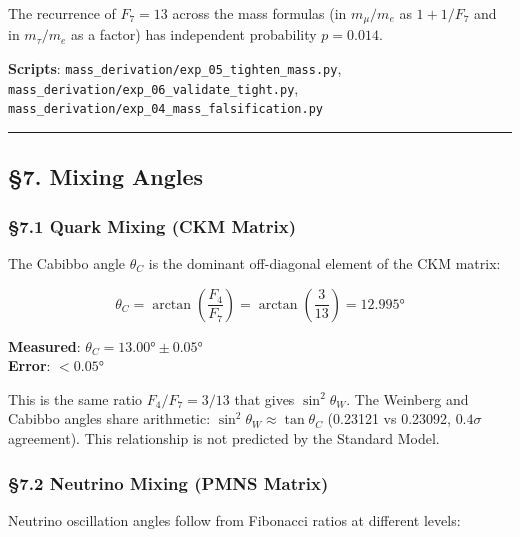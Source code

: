 \documentclass[
  11pt,
  a4paper]{article}
\begin{document}
The recurrence of \(F_7 = 13\) across the mass formulas (in
\(m_\mu/m_e\) as \(1 + 1/F_7\) and in \(m_\tau/m_e\) as a factor) has
independent probability \(p = 0.014\).

\textbf{Scripts}: \texttt{mass\_derivation/exp\_05\_tighten\_mass.py},
\texttt{mass\_derivation/exp\_06\_validate\_tight.py},
\texttt{mass\_derivation/exp\_04\_mass\_falsification.py}

\begin{center}\rule{0.5\linewidth}{0.5pt}\end{center}

\subsection{§7. Mixing Angles}\label{mixing-angles}

\subsubsection{§7.1 Quark Mixing (CKM
Matrix)}\label{quark-mixing-ckm-matrix}

The Cabibbo angle \(\theta_C\) is the dominant off-diagonal element of
the CKM matrix:

\[\theta_C = \arctan\left(\frac{F_4}{F_7}\right) = \arctan\left(\frac{3}{13}\right) = 12.995°\]

\textbf{Measured}: \(\theta_C = 13.00° \pm 0.05°\)\\
\textbf{Error}: \(< 0.05°\)

This is the same ratio \(F_4/F_7 = 3/13\) that gives \(\sin^2\theta_W\).
The Weinberg and Cabibbo angles share arithmetic:
\(\sin^2\theta_W \approx \tan\theta_C\) (0.23121 vs 0.23092,
\(0.4\sigma\) agreement). This relationship is not predicted by the
Standard Model.

\subsubsection{§7.2 Neutrino Mixing (PMNS
Matrix)}\label{neutrino-mixing-pmns-matrix}

Neutrino oscillation angles follow from Fibonacci ratios at different
levels:
\end{document}
